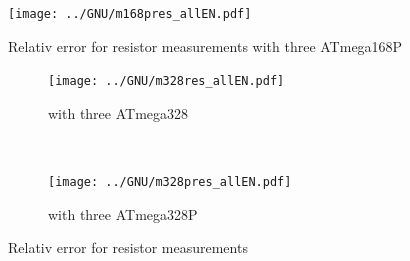 \begin{figure}[H]
\centering
\texttt{[image: ../GNU/m168pres\_allEN.pdf]}
\caption{Relativ error for resistor measurements with three ATmega168P }
\label{fig:m168pres_all}
\end{figure}

\begin{figure}[H]
  \begin{subfigure}[b]{.5\textwidth}
    \centering
    \texttt{[image: ../GNU/m328res\_allEN.pdf]}
    \caption{with three ATmega328}
    \label{fig:m328res_all}
  \end{subfigure}
  ~
  \begin{subfigure}[b]{.5\textwidth}
    \centering
    \texttt{[image: ../GNU/m328pres\_allEN.pdf]}
    \caption{with three ATmega328P}
    \label{fig:m328pres_all}
  \end{subfigure}
\caption{Relativ error for resistor measurements}
\end{figure}

